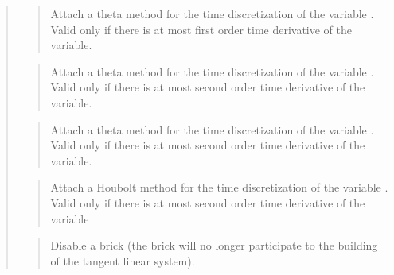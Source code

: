 \documentclass[a4paper,11pt,english]{sphinxmanual}
\begin{document}
\begin{quote}
\begin{quote}

Attach a theta method for the time discretization of the variable
. Valid only if there is at most first order time derivative
of the variable.
\end{quote}

\begin{quote}

Attach a theta method for the time discretization of the variable
. Valid only if there is at most second order time derivative
of the variable.
\end{quote}

\begin{quote}

Attach a theta method for the time discretization of the variable
. Valid only if there is at most second order time derivative
of the variable.
\end{quote}

\begin{quote}

Attach a Houbolt method for the time discretization of the variable
. Valid only if there is at most second order time derivative
of the variable
\end{quote}

\begin{quote}

Disable a brick (the brick will no longer participate to the
building of the tangent linear system).
\end{quote}

\begin{quote}


\end{quote}
\end{quote}
\end{document}
